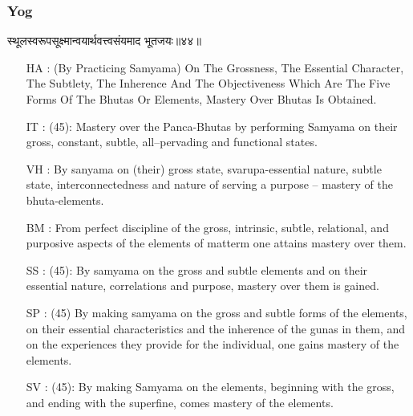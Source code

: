 \begin{frame}[fragile]\frametitle{Yog}
\begin{sanskrit}
स्थूलस्वरूपसूक्ष्मान्वयार्थवत्त्वसंयमाद भूतजयः॥४४॥
\end{sanskrit}
	\begin{itemize}
	\item [HA]: (By Practicing Samyama) On The Grossness, The Essential Character, The Subtlety, The Inherence And The Objectiveness Which Are The Five Forms Of The Bhutas Or Elements, Mastery Over Bhutas Is Obtained.
	\item [IT]: (45): Mastery over the Panca-Bhutas by performing Samyama on their gross, constant, subtle, all–pervading and functional states.
	\item [VH]: By sanyama on (their) gross state, svarupa-essential nature, subtle state, interconnectedness and nature of serving a purpose – mastery of the bhuta-elements.
	\item [BM]: From perfect discipline of the gross, intrinsic, subtle, relational, and purposive aspects of the elements of matterm one attains mastery over them.
	\item [SS]: (45): By samyama on the gross and subtle elements and on their essential nature, correlations and purpose, mastery over them is gained.
	\item [SP]: (45) By making samyama on the gross and subtle forms of the elements, on their essential characteristics and the inherence of the gunas in them, and on the experiences they provide for the individual, one gains mastery of the elements.
	\item [SV]: (45): By making Samyama on the elements, beginning with the gross, and ending with the superfine, comes mastery of the elements.
	\end{itemize}
\end{frame}

